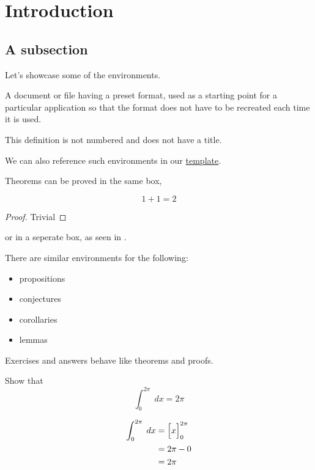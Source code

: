 \section{Introduction}\label{sec:1}
\subsection{A subsection}

Let's showcase some of the environments.
\begin{definition}[title=Template, label=template]
	A document or file having a preset format, used as a starting point for a particular application so that the format does not have to be recreated each time it is used.
\end{definition}
\begin{definition*}
	This definition is not numbered and does not have a title.
\end{definition*}

We can also reference such environments in our \hyperref[def:template]{template}.

Theorems can be proved in the same box,

\begin{theorem}[label=addone]
	\begin{equation*}
		1 + 1 = 2
	\end{equation*}
	\begin{proof}
		Trivial
	\end{proof}
\end{theorem}

or in a seperate box, as seen in .

There are similar environments for the following:
\begin{itemize}
	\item propositions
	\item conjectures
	\item corollaries
	\item lemmas
\end{itemize}

Exercises and answers behave like theorems and proofs.
\begin{exercise}
	Show that
	\begin{equation*}
		\int_{0}^{2\pi}\;dx = 2\pi
	\end{equation*}
	\begin{answer}
		\begin{align*}
			\int_{0}^{2\pi}\;dx & = \Bigl[x\Bigr]_{0}^{2\pi} \\
			                    & = 2\pi - 0                 \\
			                    & = 2\pi
		\end{align*}
	\end{answer}
\end{exercise}

